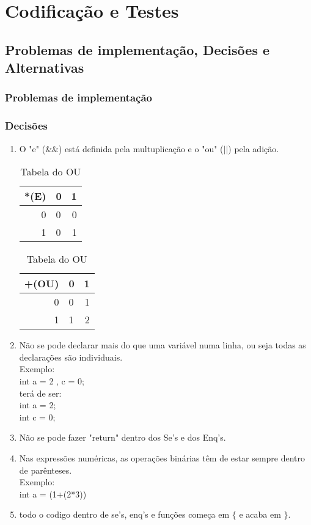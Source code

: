 \documentclass{report}
\begin{document}
\chapter{Codificação e Testes}
\section{Problemas de implementação, Decisões e Alternativas}
\subsection{Problemas de implementação}

   


\subsection{Decisões}
\begin{enumerate}[1)]
	\item O "e" ($\&\&$) está definida pela multuplicação e o "ou" ($||$) pela adição.
 
	 \begin{table}[h]
		\begin{center}
	 	\caption{Tabela do E}
	 	\begin{tabular}{r|lr}
	 	 *(E)& 0 & 1\\ %
	 	\hline          %
	 	0 & 0 & 0 \\
	 	1 & 0 & 1\\
 	
		\end{tabular}
		\caption{Tabela do OU}
		\begin{tabular}{r|lr}
		+(OU)& 0 & 1\\ %
		\hline          %
		0 & 0 & 1 \\
		1 & 1 & 2\\
		\end{tabular}
		\end{center}
	\end{table}

	\item Não se pode declarar mais do que uma variável numa linha, ou seja todas as declarações são individuais.\\
	 Exemplo: \\int a = 2 , c = 0;\\ terá de ser:\\
	 int a = 2;\\
	 int c = 0;\\
	 \item Não se pode fazer "return" dentro dos Se's e dos Enq's.\\ 
	 \item Nas expressões numéricas, as operações binárias têm de estar sempre dentro de parênteses.\\
	 Exemplo:\\
	 int a = (1+(2*3))
	 \item todo o codigo dentro de se's, enq's e funções começa em $\{$ e acaba em  $\}$.
	 
	
\end{enumerate}
\end{document}
